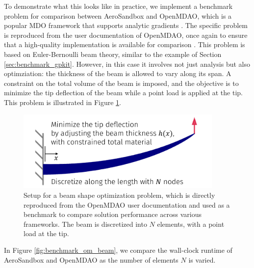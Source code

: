 To demonstrate what this looks like in practice, we implement a benchmark problem for comparison between AeroSandbox and OpenMDAO, which is a popular MDO framework that supports analytic gradients \cite{gray_openmdao_2019}. The specific problem is reproduced from the user documentation of OpenMDAO, once again to ensure that a high-quality implementation is available for comparison \cite{om_beam}. This problem is based on Euler-Bernoulli beam theory, similar to the example of Section \ref{sec:benchmark_gpkit}. However, in this case it involves not just analysis but also optimziation: the thickness of the beam is allowed to vary along its span. A constraint on the total volume of the beam is imposed, and the objective is to minimize the tip deflection of the beam while a point load is applied at the tip. This problem is illustrated in Figure \ref{fig:om-beam-opt}.

\begin{figure}[h]
    \centering
    \includegraphics[width=4in]{../figures/om_beam-crop.pdf}
    \caption{Setup for a beam shape optimization problem, which is directly reproduced from the OpenMDAO user documentation \cite{gray_openmdao_2019} and used as a benchmark to compare solution performance across various frameworks. The beam is discretized into $N$ elements, with a point load at the tip.}
    \label{fig:om-beam-opt}
\end{figure}

In Figure \ref{fig:benchmark_om_beam}, we compare the wall-clock runtime of AeroSandbox and OpenMDAO as the number of elements $N$ is varied. %

